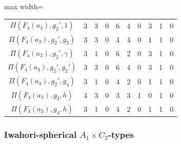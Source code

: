 \begin{table}[!ht]
\begin{adjustbox}{max width=\linewidth}
\begin{tabular}{|c|ccccccccc|}
        $\Pi(F_4(a_3),g_2',1)$ & 3 & 3 & 0 & 6 & 4 & 0 & 3 & 1 & 0 \\
        $\Pi(F_4(a_3),g_2',g_2)$ & 3 & 3 & 0 & 4 & 4 & 0 & 1 & 1 & 0 \\
        $\Pi(F_4(a_3),g_2',\gamma)$ & 3 & 1 & 0 & 6 & 2 & 0 & 3 & 1 & 0 \\
        $\Pi(F_4(a_3),g_2',g_2')$  & 3 & 3 & 0 & 6 & 4 & 0 & 3 & 1 & 0 \\
        $\Pi(F_4(a_3),g_2',g_4)$  & 3 & 1 & 0 & 4 & 2 & 0 & 1 & 1 & 0 \\\hdashline
        $\Pi(F_4(a_3),g_3,h)$ & {4} & {3} & 0 & {3} & {3} & 1 & 0 & 1 & 0 \\\hdashline
        $\Pi(F_4(a_3),g_4,h)$ & 3 & 1 & 0 & 4 & 2 & 0 & 1 & 1 & 0 \\\hline
        \end{tabular}
        \end{adjustbox}
    \end{table}
    \newpage

    \centering
    \subsubsection*{Iwahori-spherical \texorpdfstring{$A_1\times C_3$}{PDFstring}-types}

